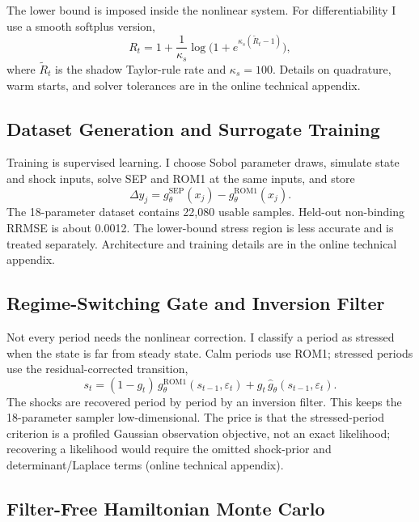 \documentclass[12pt]{article}
\theoremstyle{plain}
\theoremstyle{definition}
\theoremstyle{remark}
\newcommand{\eps}{\varepsilon}
\begin{document}
The lower bound is imposed inside the nonlinear system. For differentiability I
use a smooth softplus version,
\begin{equation}
R_t = 1 + \frac{1}{\kappa_s}\log\!\bigl(1 + e^{\kappa_s(\tilde{R}_t - 1)}\bigr), \label{eq:softplus_zlb}
\end{equation}
where \(\tilde R_t\) is the shadow Taylor-rule rate and \(\kappa_s=100\).
Details on quadrature, warm starts, and solver tolerances are in
the online technical appendix.


\subsection{Dataset Generation and Surrogate Training}
\label{subsec:surrogate}

Training is supervised learning. I choose Sobol parameter draws, simulate state
and shock inputs, solve SEP and ROM1 at the same inputs, and store
\begin{equation*}
\Delta y_j = g_\theta^{\text{SEP}}(x_j) - g_\theta^{\text{ROM1}}(x_j).
\end{equation*}
The 18-parameter dataset contains 22,080 usable samples. Held-out non-binding
RRMSE is about 0.0012. The lower-bound stress region is less accurate and is
treated separately. Architecture and training details are in
the online technical appendix.

\subsection{Regime-Switching Gate and Inversion Filter}
\label{subsec:regime_switching}

Not every period needs the nonlinear correction. I classify a period as
stressed when the state is far from steady state. Calm periods use ROM1;
stressed periods use the residual-corrected transition,
\begin{equation*}
s_t = (1-g_t)\,g_\theta^{\text{ROM1}}(s_{t-1}, \eps_t) + g_t\,\hat{g}_\theta(s_{t-1}, \eps_t).
\end{equation*}
The shocks are recovered period by period by an inversion filter. This keeps
the 18-parameter sampler low-dimensional. The price is that the stressed-period
criterion is a profiled Gaussian observation objective, not an exact likelihood;
recovering a likelihood would require the omitted shock-prior and
determinant/Laplace terms (online technical appendix).

\subsection{Filter-Free Hamiltonian Monte Carlo}
\label{subsec:hmc}
\end{document}

